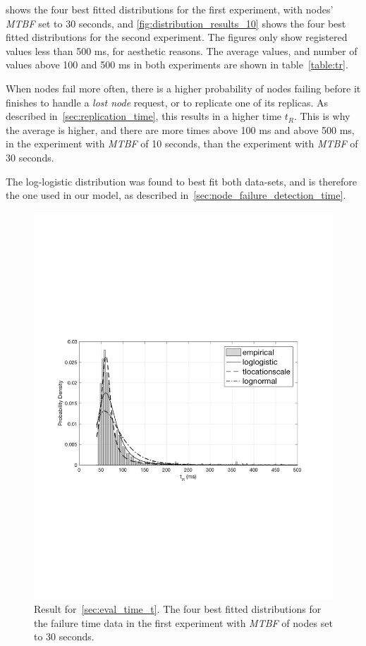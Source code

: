 \documentclass{cslthse-msc}
\begin{document}
 shows the four best fitted distributions for the first experiment, with nodes' \emph{MTBF} set to 30 seconds, and \cref{fig:distribution_results_10} shows the four best fitted distributions for the second experiment. The figures only show registered values less than 500 ms, for aesthetic reasons. The average values, and number of values above 100 and 500 ms in both experiments are shown in table~\cref{table:tr}. 

When nodes fail more often, there is a higher probability of nodes failing before it finishes to handle a \emph{lost node} request, or to replicate one of its replicas. As described in~\cref{sec:replication_time}, this results in a higher time $t_R$. This is why the average is higher, and there are more times above 100 ms and above 500 ms, in the experiment with \emph{MTBF} of 10 seconds, than the experiment with \emph{MTBF} of 30 seconds.

The log-logistic distribution was found to best fit both data-sets, and is therefore the one used in our model, as described in~\cref{sec:node_failure_detection_time}.

\begin{figure}[!hbt]
\centering
\includegraphics[scale=0.5]{images/results/distribution_results_30.pdf} 
\caption[Fitted distributions in~\cref{sec:eval_time_t}, \emph{MTBF} = 30 s]{Result for~\cref{sec:eval_time_t}. The four best fitted distributions for the failure time data in the first experiment with \emph{MTBF} of nodes set to 30 seconds.}
\label{fig:distribution_results_30}
\end{figure} 
\end{document}
